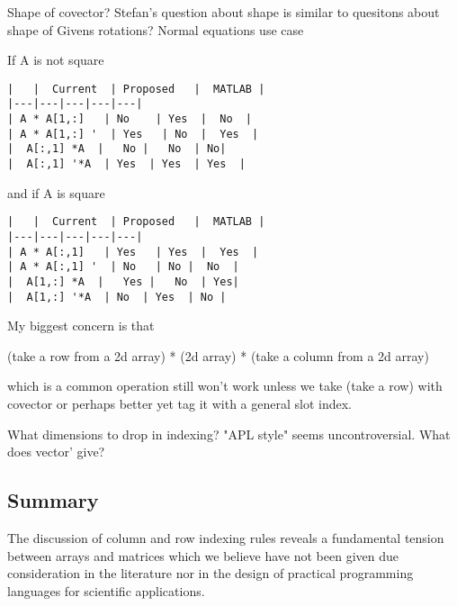 Shape of covector?
Stefan's question about shape is similar to quesitons about shape of Givens rotations?
Normal equations use case


If A is not square


\begin{verbatim}
|   |  Current  | Proposed   |  MATLAB |
|---|---|---|---|---|
| A * A[1,:]   | No    | Yes  |  No  |
| A * A[1,:] '  | Yes   | No  |  Yes  |
|  A[:,1] *A  |   No |   No  | No|
|  A[:,1] '*A  | Yes  | Yes  | Yes  |
\end{verbatim}


and if A is square


\begin{verbatim}
|   |  Current  | Proposed   |  MATLAB |
|---|---|---|---|---|
| A * A[:,1]   | Yes   | Yes  |  Yes  |
| A * A[:,1] '  | No   | No |  No  |
|  A[1,:] *A  |   Yes |   No  | Yes|
|  A[1,:] '*A  | No  | Yes  | No |
\end{verbatim}

My biggest concern is that

(take a row from a 2d array) * (2d array) * (take a column from a 2d array)

which is a common operation still won't work unless we take
(take a row) with covector or perhaps better yet
tag it with a general slot index.

What dimensions to drop in indexing? "APL style" seems uncontroversial.
What does vector' give?




\subsection{Summary}

The discussion of column and row indexing rules reveals a fundamental tension
between arrays and matrices which we believe have not been given due
consideration in the literature nor in the design of practical programming
languages for scientific applications.
